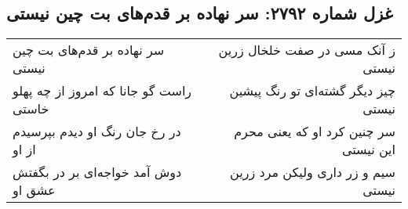\begin{center}
\section*{غزل شماره ۲۷۹۲: سر نهاده بر قدم‌های بت چین نیستی}
\label{sec:2792}
\begin{longtable}{l p{0.5cm} r}
سر نهاده بر قدم‌های بت چین نیستی
&&
ز آنک مسی در صفت خلخال زرین نیستی
\\
راست گو جانا که امروز از چه پهلو خاستی
&&
چیز دیگر گشته‌ای تو رنگ پیشین نیستی
\\
در رخ جان رنگ او دیدم بپرسیدم از او
&&
سر چنین کرد او که یعنی محرم این نیستی
\\
دوش آمد خواجه‌ای بر در بگفتش عشق او
&&
سیم و زر داری ولیکن مرد زرین نیستی
\\
\end{longtable}
\end{center}
